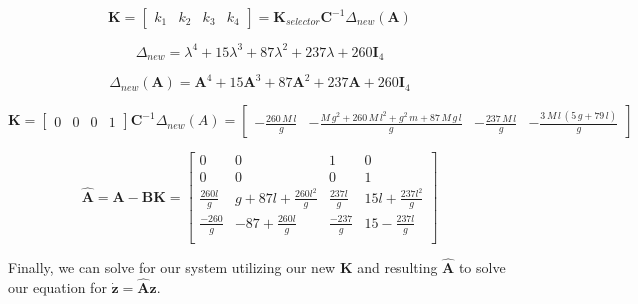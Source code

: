 \documentclass{article}
\begin{document}
\begin{equation}
    \boldsymbol{K} = \begin{bmatrix}k_1 & k_2 & k_3 & k_4\end{bmatrix} = \boldsymbol{K}_{selector} \boldsymbol{C}^{-1} \Delta_{new}(\boldsymbol{A})
\end{equation}

\begin{equation}
    \Delta_{new} = \lambda^4+15\lambda^3+87\lambda^2+237\lambda+260\boldsymbol{I}_4
\end{equation}

\begin{equation}
    \Delta_{new}(\boldsymbol{A}) = \boldsymbol{A}^4+15\boldsymbol{A}^3+87\boldsymbol{A}^2+237\boldsymbol{A}+260\boldsymbol{I}_4
\end{equation}

\begin{equation}
    \boldsymbol{K} = \begin{bmatrix}0 & 0 & 0 & 1\end{bmatrix} \boldsymbol{C}^{-1} \Delta_{new}(A) = \begin{bmatrix}
        -\frac{260\,M\,l}{g} & -\frac{M\,g^2 +260\,M\,l^2 +g^2 \,m+87\,M\,g\,l}{g} & -\frac{237\,M\,l}{g} & -\frac{3\,M\,l\,{\left(5\,g+79\,l\right)}}{g}
    \end{bmatrix}
\end{equation}

\begin{equation}
    \hat{\boldsymbol{A}} = \boldsymbol{A} - \boldsymbol{B}\boldsymbol{K} = \begin{bmatrix}
        0 & 0 & 1 & 0 \\
        0 & 0 & 0 & 1 \\[4pt]
        \frac{260l}{g} & g+87l+\frac{260l^2}{g} & \frac{237l}{g} & 15l + \frac{237l^2}{g} \\[4pt]
        \frac{-260}{g} & -87+\frac{260l}{g} & \frac{-237}{g} & 15 - \frac{237l}{g} \\[4pt]
    \end{bmatrix}
\end{equation}

Finally, we can solve for our system utilizing our new $\boldsymbol{K}$ and resulting $\hat{\boldsymbol{A}}$ to solve our equation for $\dot{\boldsymbol{z}} = \hat{\boldsymbol{A}}\boldsymbol{z}$.
\end{document}
